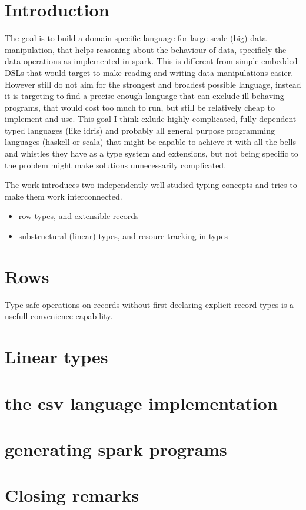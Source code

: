 \documentclass{amsart}
\begin{document}
  \section{Introduction}
The goal is to build a domain specific language for large scale (big) data
manipulation, that helps reasoning about the behaviour of data,
specificly the data operations as implemented in spark. This is
different from simple embedded DSLs that would target to make reading
and writing data manipulations easier. However still do not aim for
the strongest and broadest possible language, instead it is targeting
to find a precise enough language that can exclude ill-behaving
programs, that would cost too much to run, but still be relatively cheap to
implement and use. This goal I think exlude highly complicated, fully
dependent typed languages (like idris) and probably all general purpose
programming languages (haskell or scala) that might be capable to
achieve it with all the bells and whistles they have as a type system and
extensions, but not being specific to the problem might make solutions
unnecessarily complicated.

The work introduces two independently well studied typing concepts and
tries to make them work interconnected.
\begin{itemize}
  \item row types, and extensible records
  \item substructural (linear) types, and resoure tracking in types
\end{itemize}
  \section{Rows}
Type safe operations on records without first declaring explicit record types is a usefull convenience capability. 

  \section{Linear types}
  \section{the csv language implementation}
  \section{generating spark programs}
  \section{Closing remarks}
\end{document}
